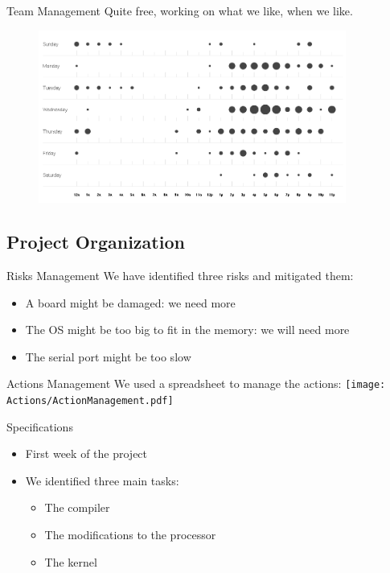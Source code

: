 \documentclass{beamer}
\begin{document}
      \begin{frame}{Team Management}
        Quite free, working on what we like, when we like.

        \pause
        \begin{figure}
          \centering
          \includegraphics[width=0.9\textwidth]{fig/punchcard.png}
        \end{figure}
      \end{frame}

    \subsection{Project Organization}
      \begin{frame}{Risks Management}
        We have identified three risks and mitigated them:
        \begin{itemize}
          \item A board might be damaged: we need more
          \item The OS might be too big to fit in the memory: we will need more
          \item The serial port might be too slow
        \end{itemize}
      \end{frame}

      \begin{frame}{Actions Management}
        We used a spreadsheet to manage the actions:
          \texttt{[image: Actions/ActionManagement.pdf]}
      \end{frame}

      \begin{frame}{Specifications}
        \begin{itemize}
          \item First week of the project
          \item We identified three main tasks:
            \begin{itemize}
              \item The compiler
              \item The modifications to the processor
              \item The kernel
            \end{itemize}
          \end{itemize}
      \end{frame}
\end{document}
